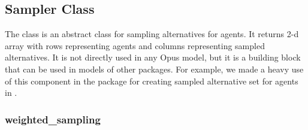 {%


\subsection{Sampler Class}
\label{sec:sampler}

The  class is an abstract class for sampling alternatives for agents.
It returns 2-d array with rows representing agents and columns representing sampled
alternatives. It is not directly used in any Opus model, but it is a building
block that can be used in models of other packages. For example, we made a
heavy use of this component in the  package for creating sampled
alternative set for agents in .

\subsubsection{weighted_sampling}

}
